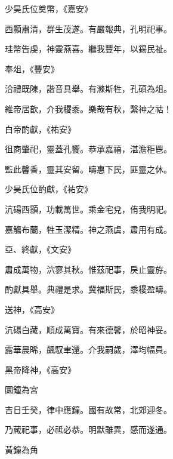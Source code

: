 \begin{pinyinscope}
 少昊氏位奠幣，《嘉安》



 西顥肅清，群生茂遂。有嚴報典，孔明祀事。



 珪幣告虔，神靈燕喜。繼我豐年，以錫民祉。



 奉俎，《豐安》



 洽禮既陳，諧音具舉。有滌斯牲，孔碩為俎。



 維帝居歆，介我稷黍。樂哉有秋，繄神之祜！



 白帝酌獻，《祐安》



 徂商肇祀，靈蓋孔饗。恭承嘉禧，湛澹秬鬯。



 監此馨香，靈其安留。疇惠下民，匪靈之休。



 少昊氏位酌獻，《祐安》



 沆碭西顥，功載萬世。乘金宅兌，侑我明祀。



 嘉觴布蘭，牲玉潔精。神之燕虞，肅用有成。



 亞、終獻，《文安》



 肅成萬物，泬寥其秋。惟茲祀事，戾止靈斿。



 酌獻具舉。典禮是求。冀福斯民，黍稷盈疇。



 送神，《高安》



 沆碭白藏，順成萬寶。有來德馨，於昭神妥。



 露華晨晞，飆馭聿還。介我嗣歲，澤均幅員。



 黑帝降神，《高安》



 圜鐘為宮



 吉日壬癸，律中應鐘。國有故常，北郊迎冬。



 乃蕆祀事，必祗必恭。明默雖異，感而遂通。



 黃鐘為角




\end{pinyinscope}
